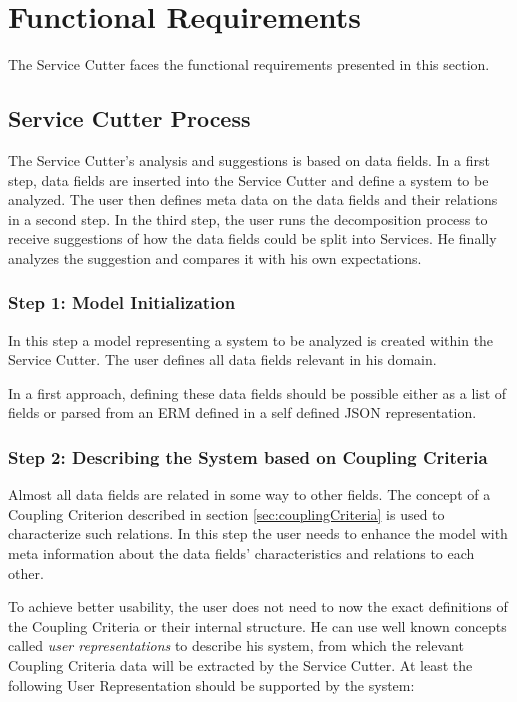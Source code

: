 \section{Functional Requirements}

The Service Cutter faces the functional requirements presented in this
section.


\subsection{Service Cutter Process}

The Service Cutter's analysis and suggestions is based on data fields. In a first step, data fields are inserted into the Service Cutter and define a system to be analyzed. The user then defines meta data on the data fields and their relations in a second step. In the third step, the user runs the decomposition process to receive suggestions of how the data fields could be split into Services. He finally analyzes the suggestion and compares it with his own expectations. 

\subsubsection{Step 1: Model Initialization}

In this step a model representing a system to be analyzed is created within the Service Cutter. The user defines all data fields relevant in his domain. 

In a first approach, defining these data fields should be possible either as a list of fields or parsed from an \gls{ERM} defined in a self defined JSON representation.

\subsubsection{Step 2: Describing the System based on Coupling Criteria}

Almost all data fields are related in some way to other fields. The concept of a Coupling Criterion described in section \ref{sec:couplingCriteria} is used to characterize such relations. In this step the user needs to enhance the model with meta information about the data fields' characteristics and relations to each other. 

To achieve better usability, the user does not need to now the exact definitions of the Coupling Criteria or their internal structure. He can use well known concepts called \textit{user representations} to describe his system, from which the relevant Coupling Criteria data will be extracted by the Service Cutter. At least the following User Representation should be supported by the system:

